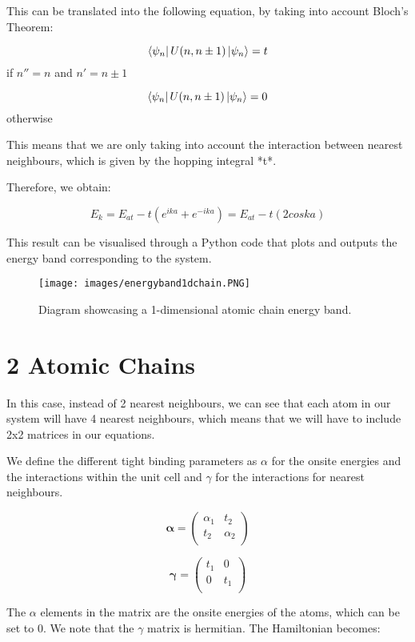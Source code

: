 \documentclass[a4paper,12pt]{report}
\begin{document}
This can be translated into the following equation, by taking into account Bloch's Theorem: 

$$ \bra{\psi_n} U(n, n \pm 1) \ket{\psi_n} = t$$ if $n''=n$ and $n'=n \pm 1 $

$$ \bra{\psi_n} U(n, n \pm 1) \ket{\psi_n} = 0 $$ otherwise 

This means that we are only taking into account the interaction between nearest neighbours, which is given by the hopping integral *t*.

Therefore, we obtain:

$$ E_k = E_{at} - t( e^{ika} + e^{-ika} ) = E_{at} - t(2coska) $$


This result can be visualised through a Python code that plots and outputs the energy band corresponding to the system. 

\begin{figure}[h]
	\begin{center}
		\texttt{[image: images/energyband1dchain.PNG]}
	\end{center}
	\caption{Diagram showcasing a 1-dimensional atomic chain energy band.} 
	\label{fig:1dchainenergyband}
\end{figure}

\section{2 Atomic Chains}
In this case, instead of 2 nearest neighbours, we can see that each atom in our system will have 4 nearest neighbours, which means that we will have to include 2x2 matrices in our equations. 

We define the different tight binding parameters as $\alpha$ for the onsite energies and the interactions within the unit cell and $\gamma$ for the interactions for nearest neighbours. 

$$        \mathbf{\alpha} = \begin{pmatrix}
\alpha_1 & t_2  \\
t_2 & \alpha_2 \\
\end{pmatrix}
$$

$$        \mathbf{\gamma} = \begin{pmatrix}
t_1 & 0  \\
0 & t_1 \\
\end{pmatrix}
$$

The $\alpha$ elements in the matrix are the onsite energies of the atoms, which can be set to 0. We note that the $\gamma$ matrix is hermitian. The Hamiltonian becomes:
\end{document}

